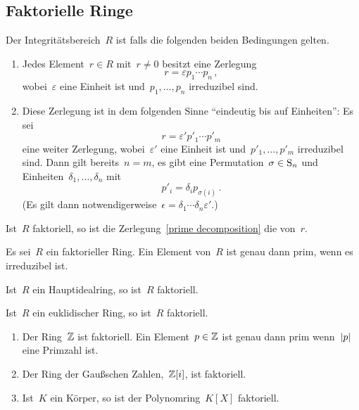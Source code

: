 \subsection{Faktorielle Ringe}

\begin{definition}
  Der Integritätsbereich~$R$ ist  falls die folgenden beiden Bedingungen gelten.
  \begin{enumerate}
    \item
      Jedes Element~$r \in R$ mit~$r \neq 0$ besitzt eine Zerlegung
      \begin{equation}
        \label{prime decomposition}
        r = \varepsilon p_1 \dotsm p_n \,,
      \end{equation}
      wobei~$\varepsilon$ eine Einheit ist und~$p_1, \dotsc, p_n$ irreduzibel sind.
    \item
      Diese Zerlegung ist in dem folgenden Sinne \enquote{eindeutig bis auf Einheiten}:
      Es sei
      \[
        r = \varepsilon' p'_1 \dotsm p'_m
      \]
      eine weiter Zerlegung, wobei~$\varepsilon'$ eine Einheit ist und~$p'_1, \dotsc, p'_m$ irreduzibel sind.
      Dann gilt bereits~$n = m$, es gibt eine Permutation~$\sigma \in \operatorname{S}_n$ und Einheiten~$\delta_1, \dotsc, \delta_n$ mit
      \[
        p'_i = \delta_i p_{\sigma(i)} \,.
      \]
      (Es gilt dann notwendigerweise~$\epsilon = \delta_1 \dotsm \delta_n \varepsilon'$.)
  \end{enumerate}
  Ist~$R$ faktoriell, so ist die Zerlegung~\eqref{prime decomposition} die  von~$r$.
\end{definition}

\begin{proposition}
  Es sei~$R$ ein faktorieller Ring.
  Ein Element von~$R$ ist genau dann prim, wenn es irreduzibel ist.
\end{proposition}

\begin{proposition}
  Ist~$R$ ein Hauptidealring, so ist~$R$ faktoriell.
\end{proposition}

\begin{corollary}
  Ist~$R$ ein euklidischer Ring, so ist~$R$ faktoriell.
\end{corollary}

\begin{example}
  \leavevmode
  \begin{enumerate}
    \item
      Der Ring~$\mathbb{Z}$ ist faktoriell.
      Ein Element~$p \in \mathbb{Z}$ ist genau dann prim wenn~$\lvert p\rvert$ eine Primzahl ist.
    \item
      Der Ring der Gaußschen Zahlen,~$\mathbb{Z}[i]$, ist faktoriell.
    \item
      Ist~$K$ ein Körper, so ist der Polynomring~$K[X]$ faktoriell.
  \end{enumerate}
\end{example}



